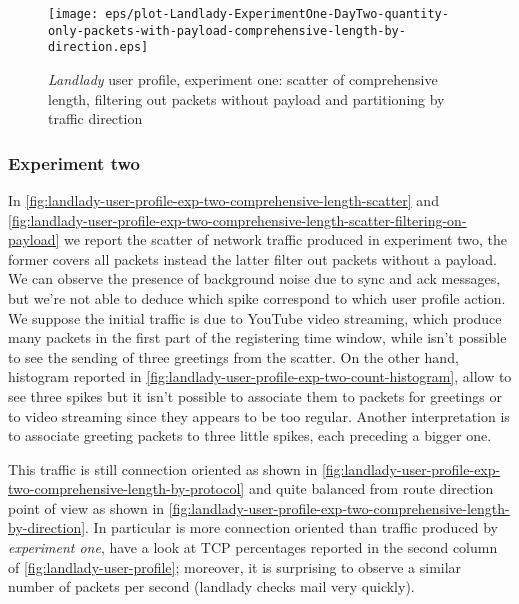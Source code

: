\documentclass[10pt,a4paper]{article}
\begin{document}
    \begin{figure}
      \centering
      \texttt{[image: eps/plot-Landlady-ExperimentOne-DayTwo-quantity-only-packets-with-payload-comprehensive-length-by-direction.eps]}
      \caption{\emph{Landlady} user profile, experiment one: scatter
        of comprehensive length, filtering out packets without payload
        and partitioning by traffic direction}
      \label{fig:landlady-user-profile-comprehensive-length-by-direction}
    \end{figure}



    \subsubsection*{Experiment two}
    In
    \autoref{fig:landlady-user-profile-exp-two-comprehensive-length-scatter}
    and
    \autoref{fig:landlady-user-profile-exp-two-comprehensive-length-scatter-filtering-on-payload}
    we report the scatter of network traffic produced in experiment
    two, the former covers all packets instead the latter filter out
    packets without a payload. We can observe the presence of
    background noise due to sync and ack messages, but we're not able
    to deduce which spike correspond to which user profile action.  We
    suppose the initial traffic is due to YouTube video streaming,
    which produce many packets in the first part of the registering
    time window, while isn't possible to see the sending of three
    greetings from the scatter. On the other hand, histogram reported
    in \autoref{fig:landlady-user-profile-exp-two-count-histogram},
    allow to see three spikes but it isn't possible to associate them
    to packets for greetings or to video streaming since they appears
    to be too regular. Another interpretation is to associate greeting
    packets to three little spikes, each preceding a bigger one.

    This traffic is still connection oriented as shown in
    \autoref{fig:landlady-user-profile-exp-two-comprehensive-length-by-protocol}
    and quite balanced from route direction point of view as shown in
    \autoref{fig:landlady-user-profile-exp-two-comprehensive-length-by-direction}. In
    particular is more connection oriented than traffic produced by
    \emph{experiment one}, have a look at TCP percentages reported in
    the second column of \autoref{fig:landlady-user-profile};
    moreover, it is surprising to observe a similar number of packets
    per second (landlady checks mail very quickly).
\end{document}
